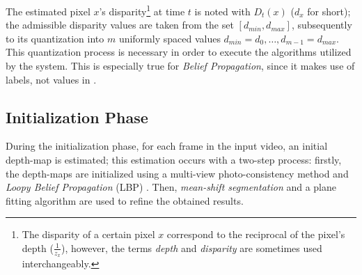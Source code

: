 \documentclass[notitlepage,english]{hgbreport}
\newcommand{\Acronym}[1]{{#1}}
\newcommand{\LBP}{\Acronym{LBP}}
\newcommand{\Vertices}{\mathcal{V}}
\newcommand{\Edges}{\mathcal{N}}
\begin{document}
 The estimated pixel $x$'s disparity\footnote{The disparity of a certain pixel $x$ correspond to the reciprocal of the pixel's depth ($\frac{1}{z_x}$), however, the terms \emph{depth} and \emph{disparity} are sometimes used interchangeably.} at time $t$ is noted with $D_t(x)$ ($d_x$ for short); the admissible disparity values are taken from the set $[d_{min}, d_{max}]$, subsequently to its quantization into $m$ uniformly spaced values $d_{min}=d_0, \dots, d_{m-1} = d_{max}$. This quantization process is necessary in order to execute the algorithms utilized by the system. This is especially true for \emph{Belief Propagation}, since it makes use of labels, not values in \R.

 
 
\subsection{Initialization Phase}\label{sec:init_phase}
During the initialization phase, for each frame in the input video, an initial depth-map is estimated; this estimation occurs with a two-step process: firstly, the depth-maps are initialized using a multi-view photo-consistency method and \emph{Loopy Belief Propagation} (\LBP) \cite{Felzenszwalb2006}. Then, \emph{mean-shift segmentation} and a plane fitting algorithm are used to refine the obtained results.


\end{document}
